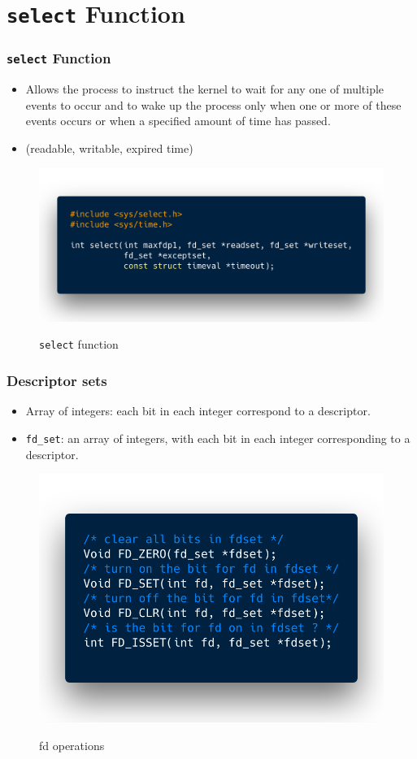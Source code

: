 \documentclass[notes,serif]{beamer}
\begin{document}
\section{\texttt{select} Function}
\begin{frame}[containsverbatim]
\frametitle{\texttt{select} Function}
\begin{itemize}
  \item Allows the process to instruct the kernel to wait for any one of multiple events
  to occur and to wake up the process only when one or more of these events
  occurs or when a specified amount of time has passed.
  \item (readable, writable, expired time)
\end{itemize}
  \begin{figure}
  \centering
  \includegraphics[width=.8\textwidth]{code/03code01.png}\\
  \caption{\texttt{select} function}
  \label{7}
  \end{figure}
\end{frame}

\begin{frame}[containsverbatim]
\frametitle{Descriptor sets}
\begin{itemize}
  \item Array of integers: each bit in each integer correspond to a descriptor.
  \item \texttt{fd\_set}: an array of integers, with each bit in each integer corresponding to a descriptor.
\end{itemize}
  \begin{figure}
  \centering
  \includegraphics[width=.6\textwidth]{code/03code02.png}\\
  \caption{fd operations}
  \label{8}
  \end{figure}
\end{frame}
\end{document}
